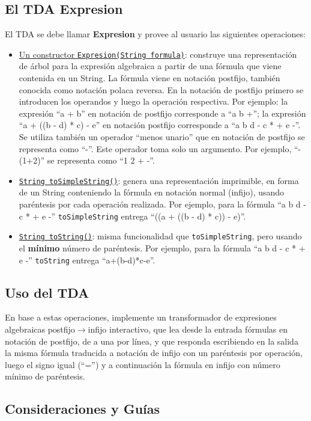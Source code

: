 \documentclass[dcc]{fcfmcourse}
\begin{document}
\subsection{El TDA Expresion}
El TDA se debe llamar \textbf{Expresion} y provee al usuario las siguientes
operaciones:
\begin{itemize}
\item \underline{Un constructor \texttt{Expresion(String formula)}}: construye una representación
de árbol para la expresión algebraica a partir de una fórmula
que viene contenida en un String. La fórmula viene en notación postfijo, también conocida como notación polaca reversa. En la notación
de postfijo primero se introducen los operandos y luego la operación
respectiva. Por ejemplo: la expresión “a + b” en notación de postfijo
corresponde a “a b +”; la expresión “a + ((b - d) * c) - e” en notación
postfijo corresponde a “a b d - c * + e -”. Se utiliza también un operador
“menos unario” que en notación de postfijo se representa como
“-”. Este operador toma solo un argumento. Por ejemplo, “-(1+2)” se
representa como “1 2 + -”.
\item \underline{\texttt{String toSimpleString()}}: genera una representación imprimible, en forma
de un String conteniendo la fórmula en notación normal (infijo), usando
paréntesis por cada operación realizada. Por ejemplo, para la fórmula “a b d - c * + e -” \texttt{toSimpleString}  entrega “((a + ((b - d) * c)) - e)”.
\item \underline{\texttt{String toString()}}: misma funcionalidad que \texttt{toSimpleString}, pero usando
el \textbf{mínimo} número de paréntesis. Por ejemplo, para la fórmula “a b d - c * + e -” \texttt{toString}  entrega “a+(b-d)*c-e”.

\end{itemize}
\subsection{Uso del TDA}
En base a estas operaciones, implemente un transformador de expresiones algebraicas postfijo$\rightarrow$infijo interactivo, que lea desde la entrada fórmulas en notación de postfijo, de a una por línea, y que responda escribiendo en la salida la misma fórmula traducida a notación de infijo con un paréntesis por operación, luego el signo igual (“=”) y a continuación  la fórmula en infijo con número mínimo de paréntesis.\\
\subsection{Consideraciones y Guías}
\end{document}
